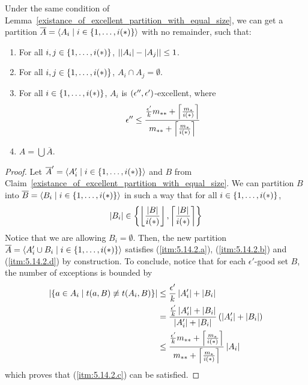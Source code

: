     \lemma[Claim 5.14.2]\label{existance_of_excellent_partition_with_equal_size_and_no_remainder}
        Under the same condition of Lemma~\ref{existance_of_excellent_partition_with_equal_size}, we can get a
        partition $\overline{A} = \left< A_i \mid i \in \left\{ 1, \dots, i(*) \right\} \right>$ with no remainder, such that:
        \begin{enumerate}[label=(\alph*), ref=\alph*]
            \item \label{itm:5.14.2.a} For all $i, j \in \left\{ 1, \dots, i(*) \right\}$, $\left| \left| A_i \right|- \left| A_j \right| \right| \leq 1$.
            \item \label{itm:5.14.2.b} For all $i, j \in \left\{ 1, \dots, i(*) \right\}$, $A_i \cap A_j = \emptyset$.
            \item \label{itm:5.14.2.c} For all $i \in \left\{ 1, \dots, i(*) \right\}$, $A_i$ is $\left( \epsilon'', \epsilon' \right)$-excellent,
                where
                $$
                    \epsilon'' \leq \frac{\frac{\epsilon'}{k} m_{**} + \left\lceil \frac{m_*}{i(*)} \right\rceil}{m_{**} + \left\lceil \frac{m_*}{i(*)} \right\rceil}
                $$
            \item \label{itm:5.14.2.d} $A = \bigcup \overline{A}$.
        \end{enumerate}
        \begin{proof}
            Let $\overline{A}' = \left< A_i' \mid i \in \left\{ 1, \dots, i(*) \right\} \right>$ and $B$ from
            Claim~\ref{existance_of_excellent_partition_with_equal_size}.
            We can partition $B$ into $\overline{B} = \left< B_i \mid i \in \left\{ 1, \dots, i(*) \right\} \right>$ in such a way that
            for all $i \in \left\{ 1, \dots, i(*) \right\}$,
            $$
                |B_i| \in \left\{ \left\lfloor \frac{\left| B \right|}{i(*)} \right\rfloor, \left\lceil \frac{\left| B \right|}{i(*)} \right\rceil \right\}
            $$
            Notice that we are allowing $B_i = \emptyset$.
            Then, the new partition $\overline{A} = \left< A_i' \cup B_i \mid i \in \left\{ 1, \dots, i(*) \right\} \right>$ satisfies
            (\ref{itm:5.14.2.a}), (\ref{itm:5.14.2.b}) and (\ref{itm:5.14.2.d}) by construction.
            To conclude, notice that for each $\epsilon'$-good set $B$, the number of exceptions is bounded by
            \begin{align*}
                \left| \left\{ a \in A_i \mid t(a, B) \not\equiv t(A_i, B) \right\} \right|
                    & \leq \frac{\epsilon'}{k} \left| A_i' \right| + \left| B_i \right| \\
                    & = \frac{\frac{\epsilon'}{k} \left| A_i' \right| + \left| B_i \right|}{\left| A_i' \right| + \left| B_i \right|}
                        \left( \left| A_i' \right| + \left| B_i \right| \right) \\
                    & \leq \frac{\frac{\epsilon'}{k} m_{**} + \left\lceil \frac{m_*}{i(*)} \right\rceil}{m_{**} + \left\lceil \frac{m_*}{i(*)} \right\rceil}
                        \left| A_i \right|
            \end{align*}
            which proves that (\ref{itm:5.14.2.c}) can be satisfied.
        \end{proof}

